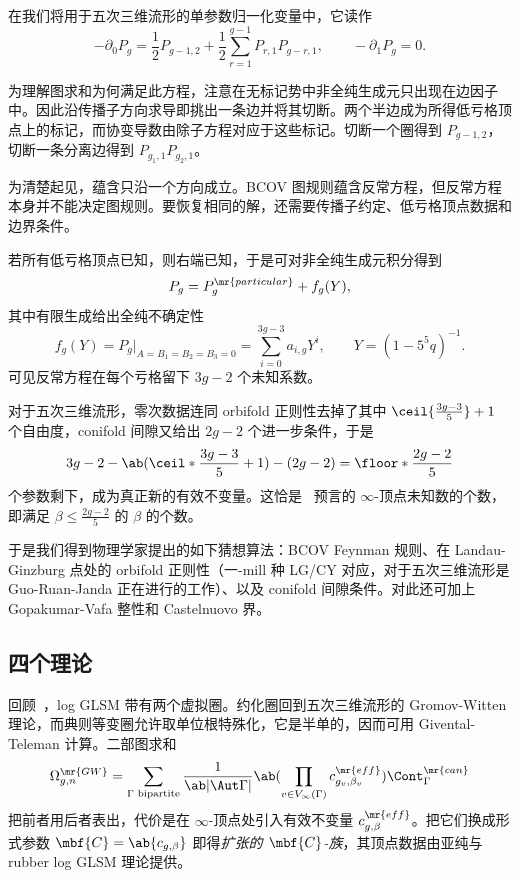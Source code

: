 \begin{rmk}
    在我们将用于五次三维流形的单参数归一化变量中，它读作
    \[ -\partial_0 P_g = \frac{1}{2}P_{g-1,2} + \frac{1}{2}\sum_{r=1}^{g-1}P_{r,1}P_{g-r,1}, \qquad -\partial_1 P_g = 0. \]
\end{rmk}

为理解图求和为何满足此方程，注意在无标记势中非全纯生成元只出现在边因子中。因此沿传播子方向求导即挑出一条边并将其切断。两个半边成为所得低亏格顶点上的标记，而协变导数由除子方程对应于这些标记。切断一个圈得到 \(P_{g-1,2}\)，切断一条分离边得到 \(P_{g_1,1}P_{g_2,1}\)。

\begin{rmk}
    为清楚起见，蕴含只沿一个方向成立。BCOV 图规则蕴含反常方程，但反常方程本身并不能决定图规则。要恢复相同的解，还需要传播子约定、低亏格顶点数据和边界条件。
\end{rmk}

若所有低亏格顶点已知，则右端已知，于是可对非全纯生成元积分得到
\[ P_g = P_g^{\mr{particular}} + f_g(Y), \]
其中有限生成给出全纯不确定性
\[ f_g(Y) = P_g|_{A = B_1 = B_2 = B_3 = 0} = \sum_{i=0}^{3g-3}a_{i,g}Y^i, \qquad Y = (1-5^5q)^{-1}. \]
可见反常方程在每个亏格留下 \(3g-2\) 个未知系数。

\begin{rmk}
    对于五次三维流形，零次数据连同 orbifold 正则性去掉了其中 \(\ceil{\frac{3g-3}{5}}+1\) 个自由度，conifold 间隙又给出 \(2g-2\) 个进一步条件，于是
    \[ 3g-2 - \ab(\ceil*{\frac{3g-3}{5}}+1) - (2g-2) = \floor*{\frac{2g-2}{5}} \]
    个参数剩下，成为真正新的有效不变量。这恰是~ 预言的 \(\infty\)-顶点未知数的个数，即满足 \(\beta \leq \frac{2g-2}{5}\) 的 \(\beta\) 的个数。
\end{rmk}

于是我们得到物理学家提出的如下猜想算法：BCOV Feynman 规则、在 Landau-Ginzburg 点处的 orbifold 正则性（一-mill 种 LG/CY 对应，对于五次三维流形是 Guo-Ruan-Janda 正在进行的工作）、以及 conifold 间隙条件。对此还可加上 Gopakumar-Vafa 整性和 Castelnuovo 界。

\subsection{四个理论}%
\label{sub:Four theories}

回顾~，log GLSM 带有两个虚拟圈。约化圈回到五次三维流形的 Gromov-Witten 理论，而典则等变圈允许取单位根特殊化，它是半单的，因而可用 Givental-Teleman 计算。二部图求和
\[ \Omega^{\mr{GW}}_{g,n} = \sum_{\Gamma \text{ bipartite}} \frac{1}{\ab|\Aut \Gamma|} \ab( \prod_{v \in V_{\infty}(\Gamma)} c^{\mr{eff}}_{g_v,\beta_v}) \Cont^{\mr{can}}_{\Gamma} \]
把前者用后者表出，代价是在 \(\infty\)-顶点处引入有效不变量 \(c^{\mr{eff}}_{g,\beta}\)。把它们换成形式参数 \(\mbf{C} = \ab\{c_{g,\beta}\}\) 即得\textit{扩张的 \(\mbf{C}\)-族}，其顶点数据由亚纯与 rubber log GLSM 理论提供。

